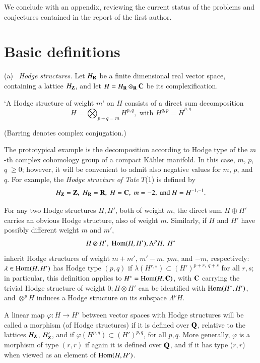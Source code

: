 We conclude with an appendix, reviewing the current status of the problems and conjectures contained in the report \cite{art4-sec21} of the first author.

\section{Basic definitions}\label{art4-sec1}
(a)~ \textit{Hodge structures.} Let $H_{\mathbf{R}}$ be a finite dimensional real vector space, containing a lattice $H_{\mathbf{Z}}$, and let $H=H_{\mathbf{R}} \otimes_{\mathbf{R}} \mathbf{C}$ be its complexification.

\begin{definition}\label{art4-def1.1}
`A Hodge structure of weight $m$' on $H$ consists of a direct sum decomposition
$$
H = \bigotimes_{p+q=m} H^{p,q}, \text{ with } H^{q,p} = \bar{H}^{p,q}
$$
\end{definition}

(Barring denotes complex conjugation.)

\begin{remark*}
The prototypical example is the decomposition according to Hodge type of the $m$-th complex cohomology group of a compact K\"ahler manifold. In this case, $m$, $p$, $q \;\geqslant 0$; however, it will be convenient to admit also negative values for $m$, $p$, and $q$. For example, the \textit{Hodge structure of Tate} $T$(1) is defined by
$$
H_{\mathbf{Z}} =\mathbf{Z}, \; H_{\mathbf{R}} = \mathbf{R}, \; H = \mathbf{C}, \; m= -2, \text{ and } H = H^{-1,-1}.
$$

For any two Hodge structures $H, H'$, both of weight $m$, the direct sum $H\oplus H'$ carries an obvious Hodge structure, also of weight $m$. Similarly, if $H$ and $H'$ have possibly different weight $m$ and $m'$,
$$
H\otimes H', \; \operatorname{Hom} (H, H'), \Lambda^p H, \; H^\ast
$$
inherit Hodge structures of weight $m+ m'$, $m'-m$, $pm$, and $-m$, respectively: $\lambda \in \operatorname{Hom}(H, H')$ has Hodge type $(p,q)$ if $\lambda(H^{r,s}) \subset (H')^{p+r, \; q+s}$ for all $r, s$; in particular, this definition applies to $H^\ast = \operatorname{Hom} (H, \mathbf{C})$, with $\mathbf{C}$ carrying the trivial Hodge structure of weight $0; H \otimes H'$ can be identified with $\operatorname{Hom} (H^\ast, H')$, and $\otimes^pH$ induces a Hodge structure on its subspace $\Lambda^p H$.
 \end{remark*}

\begin{definition}\label{art4-def1.2}
A linear map $\varphi: H \to H'$ between vector spaces with Hodge structures will be called a morphism (of Hodge structures) if it is defined over $\mathbf{Q}$, relative to the lattices $H_{\mathbf{Z}}$, $H'_{\mathbf{Z}}$, and if $\varphi (H^{p,q}) \subset (H')^{p,q}$, for all $p,q$. More generally, $\varphi$ is a morphism of type $(r,r)$ if again it is defined over $\mathbf{Q}$, and if it has type ($r, r$) when viewed as an element of $\operatorname{Hom}(H, H')$.
\end{definition}

